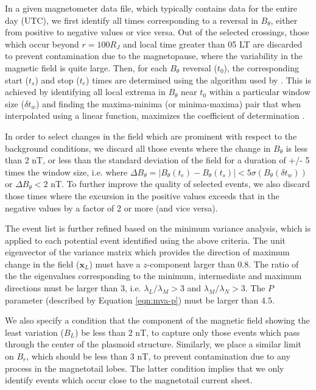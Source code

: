In a given magnetometer data file, which typically contains data for the entire day (UTC), we first identify all times corresponding to a reversal in $B_\theta$, either from positive to negative values or vice versa. Out of the selected crossings, those which occur beyond $r=100 R_J$ and local time greater than 05 LT are discarded to prevent contamination due to the magnetopause, where the variability in the magnetic field is quite large. Then, for each $B_\theta$ reversal ($t_\text{0}$), the corresponding start ($t_s$) and stop ($t_e$) times are determined using the algorithm used by . This is achieved by identifying all local extrema in $B_\theta$ near $t_0$ within a particular window size ($\delta t_w$) and finding the maxima-minima (or minima-maxima) pair that when interpolated using a linear function, maximizes the coefficient of determination \cite{Smith2017AutomatedIdentification}.

In order to select changes in the field which are prominent with respect to the background conditions, we discard all those events where the change in $B_\theta$ is less than 2 nT, or less than the standard deviation of the field for a duration of +/- 5 times the window size, i.e. where $\Delta B_\theta = |B_\theta(t_e) - B_\theta(t_s)| < 5\sigma ( B_\theta(\delta t_w))$ or $\Delta B_\theta < 2$ nT. To further improve the quality of selected events, we also discard those times where the excursion in the positive values exceeds that in the negative values by a factor of 2 or more (and vice versa). 

The event list is further refined based on the minimum variance analysis, which is applied to each potential event identified using the above criteria. The unit eigenvector of the variance matrix which provides the direction of maximum change in the field ($\mathbf{x}_L$) must have a $z$-component larger than $0.8$. The ratio of the the eigenvalues corresponding to the minimum, intermediate and maximum directions must be larger than 3, i.e. $\lambda_L / \lambda_M > 3$ and $\lambda_M / \lambda_N > 3$. The $P$ parameter (described by Equation \ref{eqn:mva-p}) must be larger than $4.5$. 

We also specify a condition that the component of the magnetic field showing the least variation ($B_L$) be less than 2 nT, to capture only those events which pass through the center of the plasmoid structure. Similarly, we place a similar limit on $B_r$, which should be less than 3 nT, to prevent contamination due to any process in the magnetotail lobes. The latter condition implies that we only identify events which occur close to the magnetotail current sheet.



